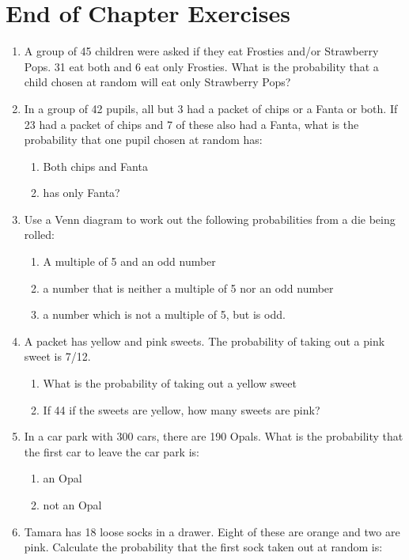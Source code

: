\documentclass[10pt,a4paper,titlepage,twoside,openright]{report}
\begin{document}
\section{End of Chapter Exercises}
\begin{enumerate}
\item A group of 45 children were asked if they eat Frosties and/or Strawberry Pops. 31 eat both and 6 eat only Frosties. What is the probability that a child chosen at random will eat only Strawberry Pops?
\item In a group of 42 pupils, all but 3 had a packet of chips or a Fanta or both. If 23 had a packet of chips and 7 of these also had a Fanta, what is the probability that one pupil chosen at random has:
	\begin{enumerate}
	\item Both chips and Fanta 
	\item has only Fanta?
	\end{enumerate} 
\item Use a Venn diagram to work out the following probabilities from a die being rolled:
	\begin{enumerate}
	\item A multiple of 5 and an odd number
	\item a number that is neither a multiple of 5 nor an odd number 
	\item a number which is not a multiple of 5, but is odd. 
	\end{enumerate}
\item A packet has yellow and pink sweets. The probability of taking out a pink sweet is 7/12. 
	\begin{enumerate}
	\item What is the probability of taking out a yellow sweet 
	\item If 44 if the sweets are yellow, how many sweets are pink? 
	\end{enumerate}
\item In a car park with 300 cars, there are 190 Opals. What is the probability that the first car to leave the car park is: 
	\begin{enumerate}
	\item an Opal
	\item not an Opal
	\end{enumerate}
\item Tamara has 18 loose socks in a drawer. Eight of these are orange and two are pink. Calculate the probability that the first sock taken out at random is: 
	\begin{enumerate}

\end{enumerate}
\end{enumerate}
\end{document}
